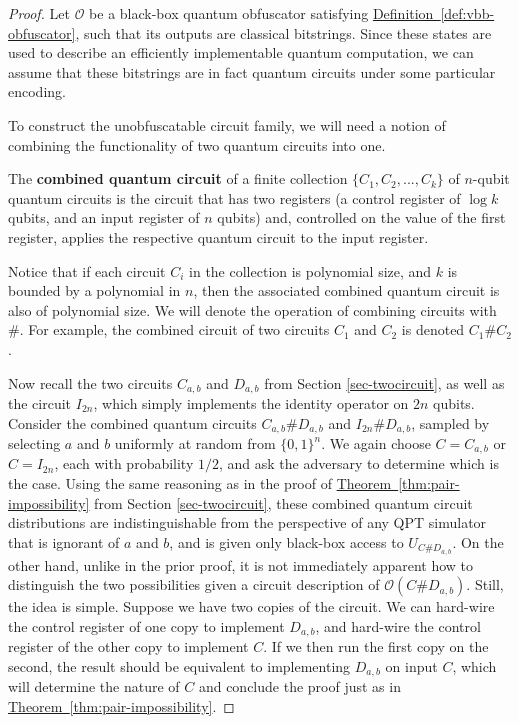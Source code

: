\documentclass[envcountsame]{llncs}
\numberwithin{equation}{section}
\newcommand{\expref}[2]{\texorpdfstring{\hyperref[#2]{#1~\ref{#2}}}{#1~\ref{#2}}}
\newcommand{\algo}{\mathcal}
\begin{document}
\begin{proof}
Let $\mathcal O$ be a black-box quantum obfuscator satisfying \expref{Definition}{def:vbb-obfuscator}, such that its outputs are classical bitstrings. Since these states are used to describe an efficiently implementable quantum computation, we can assume that these bitstrings are in fact quantum circuits under some particular encoding. 

To construct the unobfuscatable circuit family, we will need a notion of combining the functionality of two quantum circuits into one. 
\begin{definition} The {\bf combined quantum circuit} of a finite collection $\lbrace C_1,C_2,...,C_k \rbrace$ of $n$-qubit quantum circuits is the circuit that has two registers (a control register of $\log{k}$ qubits, and an input register of $n$ qubits) and, controlled on the value of the first register, applies the respective quantum circuit to the input register.   
\end{definition}

\noindent Notice that if each circuit $C_i$ in the collection is polynomial size, and $k$ is bounded by a polynomial in $n$, then the associated combined quantum circuit is also of polynomial size. We will denote the operation of combining circuits with $\#$. For example, the combined circuit of two circuits $C_1$ and $C_2$ is denoted $C_1 \# C_2$. 

Now recall the two circuits  $C_{a,b}$ and $D_{a,b}$ from Section \ref{sec-twocircuit}, as well as the circuit $I_{2n}$, which simply implements the identity operator on $2n$ qubits. Consider the combined quantum circuits $C_{a,b}\#D_{a,b}$ and $I_{2n}\#D_{a,b}$, sampled by selecting $a$ and $b$ uniformly at random from $\{0, 1\}^n$. We again choose $C = C_{a, b}$ or $C = I_{2n}$, each with probability $1/2$, and ask the adversary to determine which is the case. Using the same reasoning as in the proof of \expref{Theorem}{thm:pair-impossibility} from Section \ref{sec-twocircuit}, these combined quantum circuit distributions are indistinguishable from the perspective of any QPT simulator that is ignorant of $a$ and $b$, and is given only black-box access to $U_{C \# D_{a, b}}$.  On the other hand, unlike in the prior proof, it is not immediately apparent how to distinguish the two possibilities given a circuit description of $\algo{O}(C \#D_{a,b})$. Still, the idea is simple. Suppose we have two copies of the circuit. We can hard-wire the control register of one copy to implement $D_{a, b}$, and hard-wire the control register of the other copy to implement $C$. If we then run the first copy on the second, the result should be equivalent to implementing $D_{a, b}$ on input $C$, which will determine the nature of $C$ and conclude the proof just as in \expref{Theorem}{thm:pair-impossibility}.


\end{proof}
\end{document}
